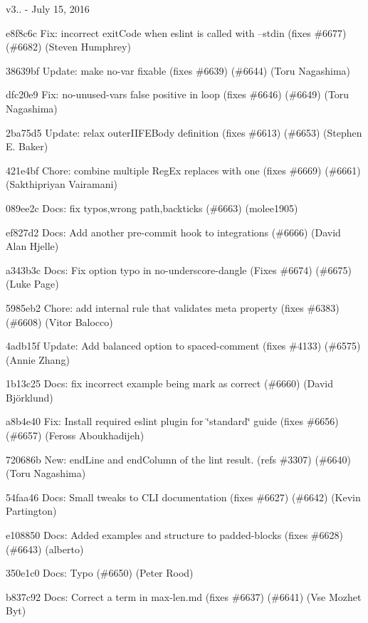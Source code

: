 v3.. -\/ July 15, 2016


\begin{DoxyItemize}
\item e8f8c6c Fix\+: incorrect exit\+Code when eslint is called with --stdin (fixes \#6677) (\#6682) (Steven Humphrey)
\item 38639bf Update\+: make {\ttfamily no-\/var} fixable (fixes \#6639) (\#6644) (Toru Nagashima)
\item dfc20e9 Fix\+: {\ttfamily no-\/unused-\/vars} false positive in loop (fixes \#6646) (\#6649) (Toru Nagashima)
\item 2ba75d5 Update\+: relax outer\+I\+I\+F\+E\+Body definition (fixes \#6613) (\#6653) (Stephen E. Baker)
\item 421e4bf Chore\+: combine multiple Reg\+Ex replaces with one (fixes \#6669) (\#6661) (Sakthipriyan Vairamani)
\item 089ee2c Docs\+: fix typos,wrong path,backticks (\#6663) (molee1905)
\item ef827d2 Docs\+: Add another pre-\/commit hook to integrations (\#6666) (David Alan Hjelle)
\item a343b3c Docs\+: Fix option typo in no-\/underscore-\/dangle (Fixes \#6674) (\#6675) (Luke Page)
\item 5985eb2 Chore\+: add internal rule that validates meta property (fixes \#6383) (\#6608) (Vitor Balocco)
\item 4adb15f Update\+: Add {\ttfamily balanced} option to {\ttfamily spaced-\/comment} (fixes \#4133) (\#6575) (Annie Zhang)
\item 1b13c25 Docs\+: fix incorrect example being mark as correct (\#6660) (David Björklund)
\item a8b4e40 Fix\+: Install required eslint plugin for \char`\"{}standard\char`\"{} guide (fixes \#6656) (\#6657) (Feross Aboukhadijeh)
\item 720686b New\+: {\ttfamily end\+Line} and {\ttfamily end\+Column} of the lint result. (refs \#3307) (\#6640) (Toru Nagashima)
\item 54faa46 Docs\+: Small tweaks to C\+LI documentation (fixes \#6627) (\#6642) (Kevin Partington)
\item e108850 Docs\+: Added examples and structure to {\ttfamily padded-\/blocks} (fixes \#6628) (\#6643) (alberto)
\item 350e1c0 Docs\+: Typo (\#6650) (Peter Rood)
\item b837c92 Docs\+: Correct a term in max-\/len.\+md (fixes \#6637) (\#6641) (Vse Mozhet Byt)

\end{DoxyItemize}
